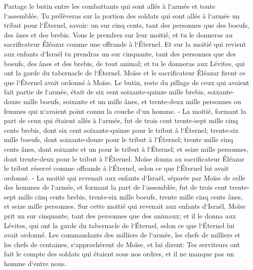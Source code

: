 \verse Partage le butin entre les combattants qui sont allés à l`armée et toute l`assemblée. 
\verse Tu prélèveras sur la portion des soldats qui sont allés à l`armée un tribut pour l`Éternel, savoir: un sur cinq cents, tant des personnes que des boeufs, des ânes et des brebis. 
\verse Vous le prendrez sur leur moitié, et tu le donneras au sacrificateur Éléazar comme une offrande à l`Éternel. 
\verse Et sur la moitié qui revient aux enfants d`Israël tu prendras un sur cinquante, tant des personnes que des boeufs, des ânes et des brebis, de tout animal; et tu le donneras aux Lévites, qui ont la garde du tabernacle de l`Éternel. 
\verse Moïse et le sacrificateur Éléazar firent ce que l`Éternel avait ordonné à Moïse. 
\verse Le butin, reste du pillage de ceux qui avaient fait partie de l`armée, était de six cent soixante-quinze mille brebis, 
\verse soixante-douze mille boeufs, 
\verse soixante et un mille ânes, 
\verse et trente-deux mille personnes ou femmes qui n`avaient point connu la couche d`un homme. - 
\verse La moitié, formant la part de ceux qui étaient allés à l`armée, fut de trois cent trente-sept mille cinq cents brebis, 
\verse dont six cent soixante-quinze pour le tribut à l`Éternel; 
\verse trente-six mille boeufs, dont soixante-douze pour le tribut à l`Éternel; 
\verse trente mille cinq cents ânes, dont soixante et un pour le tribut à l`Éternel; 
\verse et seize mille personnes, dont trente-deux pour le tribut à l`Éternel. 
\verse Moïse donna au sacrificateur Éléazar le tribut réservé comme offrande à l`Éternel, selon ce que l`Éternel lui avait ordonné. - 
\verse La moitié qui revenait aux enfants d`Israël, séparée par Moïse de celle des hommes de l`armée, 
\verse et formant la part de l`assemblée, fut de trois cent trente-sept mille cinq cents brebis, 
\verse trente-six mille boeufs, 
\verse trente mille cinq cents ânes, 
\verse et seize mille personnes. 
\verse Sur cette moitié qui revenait aux enfants d`Israël, Moïse prit un sur cinquante, tant des personnes que des animaux; et il le donna aux Lévites, qui ont la garde du tabernacle de l`Éternel, selon ce que l`Éternel lui avait ordonné. 
\verse Les commandants des milliers de l`armée, les chefs de milliers et les chefs de centaines, s`approchèrent de Moïse, 
\verse et lui dirent: Tes serviteurs ont fait le compte des soldats qui étaient sous nos ordres, et il ne manque pas un homme d`entre nous. 

